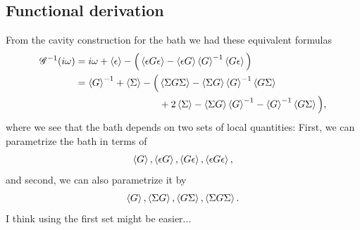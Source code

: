 \documentclass[12pt,a4paper]{scrartcl}
\numberwithin{equation}{section}
\begin{document}
 \subsection{Functional derivation}
 From the cavity construction for the bath we had these equivalent formulas
 \begin{align}
 \mathscr{G}^{-1}(i\omega) 
 &= i\omega + \braket{\epsilon} - \Big( \braket{ \epsilon G \epsilon } - \braket{\epsilon G} \braket{G}^{-1}  \braket{ G \epsilon }  \Big) \label{eq:gbath_cavity_eG} \\
%
 &= \braket{G}^{-1} + \braket{\Sigma} 
  - \Big( \braket{\Sigma G \Sigma} - \braket{\Sigma G} \braket{G}^{-1} \braket{G\Sigma} \nonumber \\
     & \hspace{3.0cm} + 2\braket{\Sigma} - \braket{\Sigma G} \braket{G}^{-1} - \braket{G}^{-1}\braket{G\Sigma}\Big) ,
 \end{align}
 where we see that the bath depends on two sets of local quantities:
 First, we can parametrize the bath in terms of
 \begin{align}
  \braket{G}, \braket{\epsilon G}, \braket{G \epsilon }, \braket{\epsilon G \epsilon},
 \end{align}
 and second, we can also parametrize it by
 \begin{align}
  \braket{G}, \braket{\Sigma G}, \braket{G \Sigma }, \braket{\Sigma G \Sigma}.
 \end{align}
 I think using the first set might be easier...
 
\end{document}
